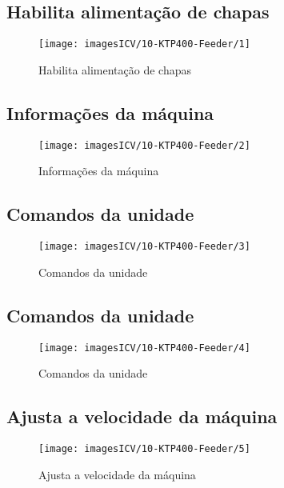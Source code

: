 \usepackage{graphicx}
\usepackage{wasysym}
\newpage
\thispagestyle{fancy}
\vspace{\fill}

\subsection{\small Habilita alimentação de chapas}
\begin{figure}
    \centering
    \texttt{[image: imagesICV/10-KTP400-Feeder/1]}
    \caption{Habilita alimentação de chapas}
\end{figure}
\newpage

\thispagestyle{fancy}
\vspace{\fill}
\subsection{\small Informações da máquina}
\begin{figure}
    \centering
    \texttt{[image: imagesICV/10-KTP400-Feeder/2]}
    \caption{Informações da máquina}
\end{figure}
\newpage

\thispagestyle{fancy}
\vspace{\fill}
\subsection{\small Comandos da unidade}
\begin{figure}
    \centering
    \texttt{[image: imagesICV/10-KTP400-Feeder/3]}
    \caption{Comandos da unidade}
\end{figure}
\newpage

\thispagestyle{fancy}
\vspace{\fill}
\subsection{\small Comandos da unidade}
\begin{figure}
    \centering
    \texttt{[image: imagesICV/10-KTP400-Feeder/4]}
    \caption{Comandos da unidade}
\end{figure}
\newpage

\thispagestyle{fancy}
\vspace{\fill}
\subsection{\small Ajusta a velocidade da máquina}
\begin{figure}
    \centering
    \texttt{[image: imagesICV/10-KTP400-Feeder/5]}
    \caption{Ajusta a velocidade da máquina}
\end{figure}
\newpage

